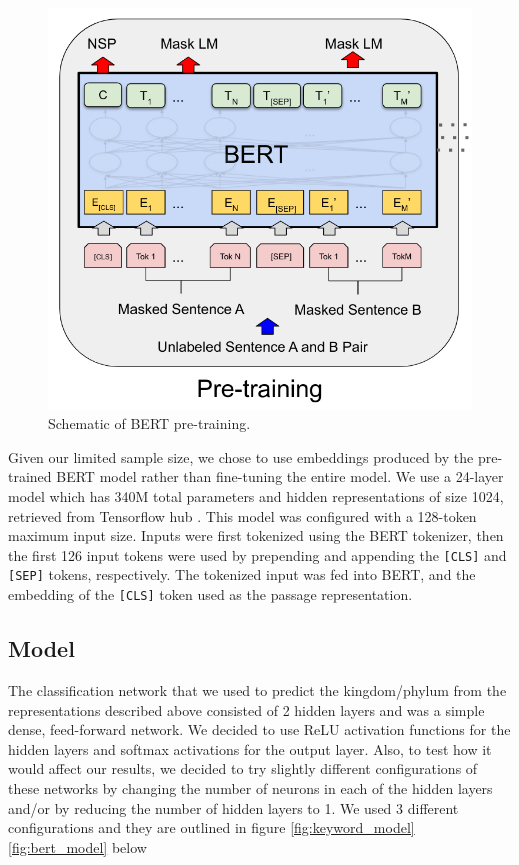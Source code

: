 \documentclass[10pt,twocolumn,letterpaper]{article}
\begin{document}
\begin{figure}
  \includegraphics[width=\linewidth]{bert_pretrain.png}
  \caption{Schematic of BERT pre-training.}
  \label{fig:bert_pretrain}
\end{figure}

Given our limited sample size, we chose to use embeddings produced by the pre-trained BERT model rather than fine-tuning the entire model. We use a 24-layer model which has 340M total parameters and hidden representations of size 1024, retrieved from Tensorflow hub \cite{tfHub}. This model was configured with a 128-token maximum input size. Inputs were first tokenized using the BERT tokenizer, then the first 126 input tokens were used by prepending and appending the \texttt{[CLS]} and \texttt{[SEP]} tokens, respectively. The tokenized input was fed into BERT, and the embedding of the \texttt{[CLS]} token used as the passage representation. 

\subsection{Model}

The classification network that we used to predict the kingdom/phylum from the representations described above consisted of 2 hidden layers and was a simple dense, feed-forward network. We decided to use ReLU activation functions for the hidden layers and softmax activations for the output layer. Also, to test how it would affect our results, we decided to try slightly different configurations of these networks by changing the number of neurons in each of the hidden layers and/or by reducing the number of hidden layers to 1. We used 3 different configurations and they are outlined in figure \ref{fig:keyword_model} \ref{fig:bert_model} below
\end{document}
